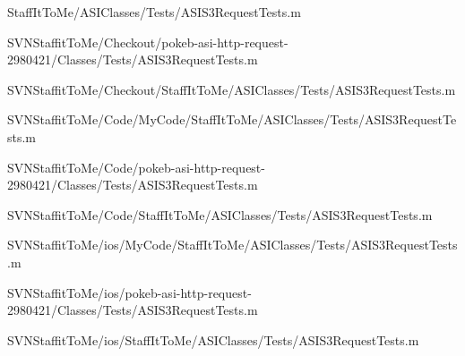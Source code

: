 \begin{DoxyCompactItemize}
\-Staff\-It\-To\-Me/\-A\-S\-I\-Classes/\-Tests/\-A\-S\-I\-S3\-Request\-Tests.\-m\item 
\-S\-V\-N\-Staffit\-To\-Me/\-Checkout/pokeb-\/asi-\/http-\/request-\/2980421/\-Classes/\-Tests/\-A\-S\-I\-S3\-Request\-Tests.\-m\item 
\-S\-V\-N\-Staffit\-To\-Me/\-Checkout/\-Staff\-It\-To\-Me/\-A\-S\-I\-Classes/\-Tests/\-A\-S\-I\-S3\-Request\-Tests.\-m\item 
\-S\-V\-N\-Staffit\-To\-Me/\-Code/\-My\-Code/\-Staff\-It\-To\-Me/\-A\-S\-I\-Classes/\-Tests/\-A\-S\-I\-S3\-Request\-Tests.\-m\item 
\-S\-V\-N\-Staffit\-To\-Me/\-Code/pokeb-\/asi-\/http-\/request-\/2980421/\-Classes/\-Tests/\-A\-S\-I\-S3\-Request\-Tests.\-m\item 
\-S\-V\-N\-Staffit\-To\-Me/\-Code/\-Staff\-It\-To\-Me/\-A\-S\-I\-Classes/\-Tests/\-A\-S\-I\-S3\-Request\-Tests.\-m\item 
\-S\-V\-N\-Staffit\-To\-Me/ios/\-My\-Code/\-Staff\-It\-To\-Me/\-A\-S\-I\-Classes/\-Tests/\-A\-S\-I\-S3\-Request\-Tests.\-m\item 
\-S\-V\-N\-Staffit\-To\-Me/ios/pokeb-\/asi-\/http-\/request-\/2980421/\-Classes/\-Tests/\-A\-S\-I\-S3\-Request\-Tests.\-m\item 
\-S\-V\-N\-Staffit\-To\-Me/ios/\-Staff\-It\-To\-Me/\-A\-S\-I\-Classes/\-Tests/\-A\-S\-I\-S3\-Request\-Tests.\-m\end{DoxyCompactItemize}
